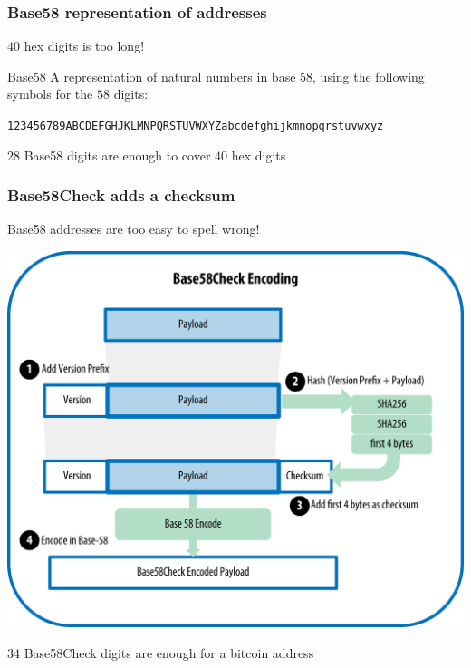 \documentclass[11pt]{beamer}  %
\begin{document}
\begin{frame}\frametitle{Base58 representation of addresses}

  \begin{center}
    $40$ hex digits is too long!
  \end{center}

  \begin{greenbox}{Base58}
    A representation of natural numbers in base $58$, using the following
    symbols for the $58$ digits:

    \texttt{123456789ABCDEFGHJKLMNPQRSTUVWXYZabcdefghijkmnopqrstuvwxyz}

  \end{greenbox}

  \begin{center}
    $28$ Base58 digits are enough to cover $40$ hex digits
  \end{center}

\end{frame}

\begin{frame}\frametitle{Base58Check adds a checksum}

  \begin{center}
    Base58 addresses are too easy to spell wrong!
  \end{center}

  \begin{center}
    \includegraphics[scale=0.6,clip=false]{pictures/mbc2_0406.png}
  \end{center}

  \begin{center}
    $34$ Base58Check digits are enough for a bitcoin address
  \end{center}

\end{frame}
\end{document}
